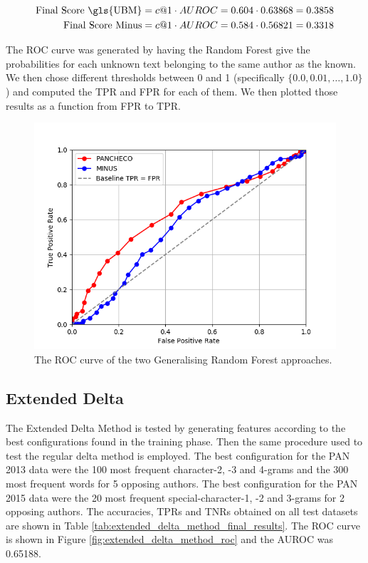 \begin{align}
    \text{Final Score \gls{UBM}} &= c@1 \cdot AUROC = 0.604 \cdot 0.63868 = 0.3858  \\
    \text{Final Score Minus} &= c@1 \cdot AUROC = 0.584 \cdot 0.56821 = 0.3318
\end{align}

The \gls{ROC} curve was generated by having the Random Forest give the
probabilities for each unknown text belonging to the same author as the known.
We then chose different thresholds between 0 and 1 (specifically $\{0.0, 0.01,
\dots, 1.0\}$) and computed the \gls{TPR} and \gls{FPR} for each of them. We
then plotted those results as a function from \gls{FPR} to \gls{TPR}.

\begin{figure}
    \centering
    \includegraphics[width=.7\textwidth]{./pictures/forest_roc.png}
    \caption{The ROC curve of the two Generalising Random Forest
    approaches.}
    \label{fig:forest_roc}
\end{figure}

\subsection{Extended Delta} \label{subsec:results:extended_delta}

The Extended Delta Method is tested by generating features according to the best
configurations found in the training phase. Then the same procedure used to
test the regular delta method is employed. The best configuration for the PAN
2013 data were the 100 most frequent character-2, -3 and 4-grams and the 300
most frequent words for 5 opposing authors. The best configuration for the PAN
2015 data were the 20 most frequent special-character-1, -2 and 3-grams for 2
opposing authors. The accuracies, \gls{TPR}s and \gls{TNR}s obtained on all test
datasets are shown in Table \ref{tab:extended_delta_method_final_results}. The
\gls{ROC} curve is shown in Figure \ref{fig:extended_delta_method_roc} and the
\gls{AUROC} was 0.65188.

